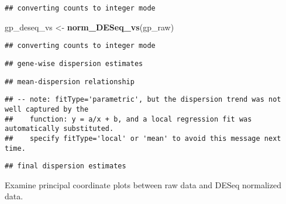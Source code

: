 \documentclass[
]{book}
\newenvironment{Shaded}{\begin{snugshade}}{\end{snugshade}}
\newcommand{\KeywordTok}[1]{\textcolor[rgb]{0.13,0.29,0.53}{\textbf{#1}}}
\newcommand{\NormalTok}[1]{#1}
\newcommand{\StringTok}[1]{\textcolor[rgb]{0.31,0.60,0.02}{#1}}
\begin{document}
\begin{verbatim}
## converting counts to integer mode
\end{verbatim}

\begin{Shaded}
\begin{Highlighting}[]
\NormalTok{gp\_deseq\_vs \textless{}{-}}\StringTok{ }\KeywordTok{norm\_DESeq\_vs}\NormalTok{(gp\_raw)}
\end{Highlighting}
\end{Shaded}

\begin{verbatim}
## converting counts to integer mode
\end{verbatim}

\begin{verbatim}
## gene-wise dispersion estimates
\end{verbatim}

\begin{verbatim}
## mean-dispersion relationship
\end{verbatim}

\begin{verbatim}
## -- note: fitType='parametric', but the dispersion trend was not well captured by the
##    function: y = a/x + b, and a local regression fit was automatically substituted.
##    specify fitType='local' or 'mean' to avoid this message next time.
\end{verbatim}

\begin{verbatim}
## final dispersion estimates
\end{verbatim}

Examine principal coordinate plots between raw data and DESeq normalized data.
\end{document}
